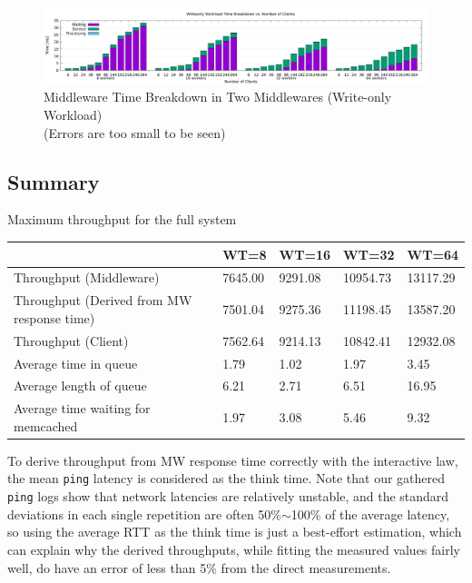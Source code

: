 \begin{figure}[!h]
\centering
\includegraphics[width=1.0\textwidth]{img/4_breakdown.png}
\captionsetup{justification=centering}
\caption{\label{fig:4.1breakdown}Middleware Time Breakdown in Two Middlewares (Write-only Workload) \\(Errors are too small to be seen)}
\end{figure}

\subsection{Summary}


\begin{center}
	{Maximum throughput for the full system}
	\begin{tabular}{|l|p{1.5cm}|p{1.5cm}|p{1.5cm}|p{1.5cm}|}
		\hline                                            & WT=8 & WT=16 & WT=32 & WT=64 \\ 
		\hline Throughput (Middleware)                    & 7645.00     &   9291.08    &  10954.73     & 13117.29      \\ 
		\hline Throughput (Derived from MW response time) & 7501.04     &	9275.36     &	11198.45    &	13587.20     \\ 
	    \hline Throughput (Client)                        & 7562.64     &   9214.13    &  10842.41     & 12932.08      \\ 
		\hline Average time in queue                      &  1.79   &  1.02     &   1.97    &   3.45    \\ 
		\hline Average length of queue                    &  6.21   &  2.71     &   6.51    &   16.95    \\ 
		\hline Average time waiting for memcached         &  1.97   &  3.08     &   5.46    &   9.32    \\ 
		\hline 
	\end{tabular}
\end{center}

To derive throughput from MW response time correctly with the interactive law, the mean \texttt{ping} latency is considered as the think time. Note that our gathered \texttt{ping} logs show that network latencies are relatively unstable, and the standard deviations in each single repetition are often 50\%$\sim$100\% of the average latency, so using the average RTT as the think time is just a best-effort estimation, which can explain why the derived throughputs, while fitting the measured values fairly well, do have an error of less than 5\% from the direct measurements.


